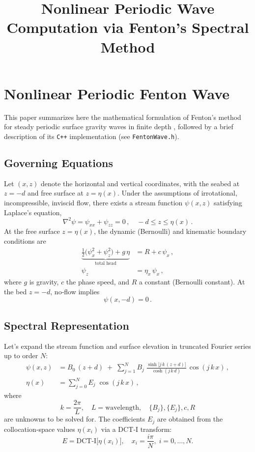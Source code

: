 \documentclass[11pt,letterpaper]{article}
\title{Nonlinear Periodic Wave Computation via Fenton’s Spectral Method}
\author{}
\date{}
\begin{document}
\maketitle

\section{Nonlinear Periodic Fenton Wave}
\label{sec:fenton_method}

\noindent
This paper summarizes here the mathematical formulation of Fenton’s method for steady periodic surface gravity waves in finite depth \cite{Fenton1988}, followed by a brief description of its \verb|C++| implementation (see \texttt{FentonWave.h}).

\subsection{Governing Equations}

Let $(x,z)$ denote the horizontal and vertical coordinates, with the seabed at $z=-d$ and free surface at $z=\eta(x)$. Under the assumptions of irrotational, incompressible, inviscid flow, there exists a stream function $\psi(x,z)$ satisfying Laplace’s equation,
\begin{equation}
\nabla^2 \psi = \psi_{xx} + \psi_{zz} = 0\,, \quad -d \le z \le \eta(x)\,.
\end{equation}
At the free surface $z=\eta(x)$, the dynamic (Bernoulli) and kinematic boundary conditions are
\begin{align}
\underbrace{\tfrac12\bigl(\psi_x^2 + \psi_z^2\bigr) + g\,\eta}_{\text{total head}}
  &= R + c\,\psi_x\,, 
  \label{eq:bernoulli}\\
\psi_z &= \eta_x\,\psi_x\,,
  \label{eq:kinematic}
\end{align}
where $g$ is gravity, $c$ the phase speed, and $R$ a constant (Bernoulli constant). At the bed $z=-d$, no‐flow implies
\begin{equation}
\psi(x,-d)=0\,.
\end{equation}

\subsection{Spectral Representation}

Let's expand the stream function and surface elevation in truncated Fourier series up to order $N$:
\begin{align}
\psi(x,z) &= B_0\,(z + d)
   \;+\;\sum_{j=1}^{N} B_j\;\frac{\sinh\!\bigl[j\,k\,(z + d)\bigr]}{\cosh(j\,k\,d)}
   \,\cos(j\,k\,x)\,,
   \label{eq:psi_series}\\
\eta(x) &= \sum_{j=0}^{N} E_j\;\cos(j\,k\,x)\,,
   \label{eq:eta_series}
\end{align}
where
\[
k = \frac{2\pi}{L}, 
\quad L = \text{wavelength}, 
\quad \{B_j\},\{E_j\},c,R
\]
are unknowns to be solved for. The coefficients $E_j$ are obtained from the collocation‐space values $\eta(x_i)$ via a DCT‐I transform:
\[
E = \mathrm{DCT\text{-}I}\bigl[\eta(x_i)\bigr], 
\quad x_i = \frac{i\pi}{N},\; i=0,\dots,N.
\]
\end{document}
